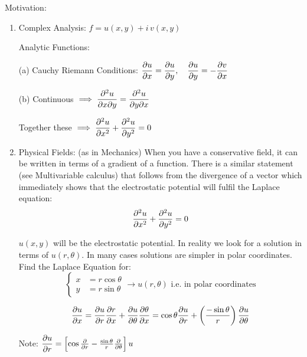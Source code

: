 \documentclass[twoside]{scrartcl}
\begin{document}
Motivation: 
\begin{enumerate}
\item Complex Analysis: $f = u(x,y) + i\,v(x,y)$

Analytic Functions:

(a) Cauchy Riemann Conditions:
$\dfrac{\partial u}{\partial x} = \dfrac{\partial u}{\partial y}, \quad \dfrac{\partial u}{\partial y} = -\dfrac{\partial v}{\partial x}$

(b) Continuous $\implies \dfrac{\partial^2u}{\partial x\partial y} = \dfrac{\partial^2u}{\partial y\partial x}$

Together these $\implies \dfrac{\partial^2u}{\partial x^2} + \dfrac{\partial^2u}{\partial y^2} = 0$\\

\item Physical Fields: 
(as in Mechanics) When you have a conservative field, it can be written in terms of a gradient of a function. There is a similar statement (see Multivariable calculus) that follows from the divergence of a vector which immediately shows that the electrostatic potential will fulfil the Laplace equation: 
\[\dfrac{\partial^2u}{\partial x^2} + \dfrac{\partial^2u}{\partial y^2} = 0\]

$u(x,y)$ will be the electrostatic potential. In reality we look for a solution in terms of $u(r,\theta)$. In many cases solutions are simpler in polar coordinates. Find the Laplace Equation for: 
\[\begin{cases} 
x &= r\cos\theta\\
y &= r\sin\theta 	
\end{cases}\longrightarrow u(r,\theta) \text{ i.e. in polar coordinates}
\]

\[\frac{\partial u}{\partial x} = \frac{\partial u}{\partial r}\frac{\partial r}{\partial x} + \frac{\partial u}{\partial \theta}\frac{\partial \theta}{\partial x} = \cos\theta \frac{\partial u}{\partial r} + \left(\frac{-\sin\theta}{r}\right)\frac{\partial u}{\partial \theta}\]

Note: $\dfrac{\partial u}{\partial r} = \left[\cos\frac{\partial}{\partial r} - \frac{\sin\theta}{r}\frac{\partial}{\partial \theta}\right]u$


\end{enumerate}
\end{document}
